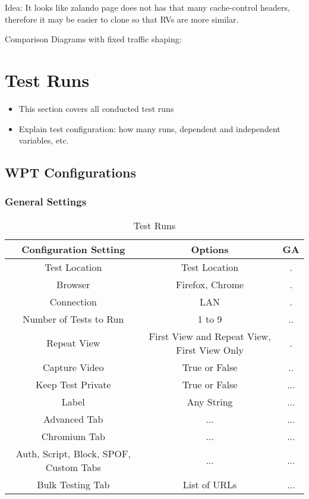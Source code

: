 Idea: It looks like zalando page does not has that many cache-control headers, therefore it may be easier to clone so that RVs are more similar.

Comparison Diagrams with fixed traffic shaping:








\section{Test Runs}

\begin{itemize}
    \item This section covers all conducted test runs
    \item Explain test configuration: how many runs, dependent and independent variables, etc.
\end{itemize}






\subsection{WPT Configurations}


\subsubsection{General Settings}

\begin{table}[h]
	\caption[Test Runs]{Test Runs \cite{DBLP:books/infix/Schwarz99}}
	\label{tab:tamodelleVergleich}
	\centering
	\begin{tabular}{ c | c | c } 
	Configuration Setting & Options & GA \\
	\hline \hline
	Test Location & Test Location & . \\ 
	Browser & Firefox, Chrome & . \\
	\hline
	Connection & LAN & . \\
	Number of Tests to Run & 1 to 9 & .. \\
	Repeat View & First View and Repeat View, First View Only & . \\
	Capture Video & True or False & .. \\
	Keep Test Private & True or False & ... \\
	Label & Any String & ... \\
	\hline	  
	Advanced Tab & ... & ... \\
	Chromium Tab & ... & ... \\
	Auth, Script, Block, SPOF, Custom Tabs & ... & ... \\
	Bulk Testing Tab & List of URLs & ... \\
	\end{tabular}
\end{table}


